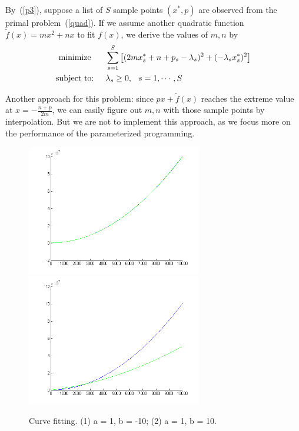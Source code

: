 By~(\ref{p3}), suppose a list of $S$ sample points $(x^*,p)$ are observed from the primal problem~(\ref{quad}). If we assume another quadratic function $\tilde{f}(x)=mx^2+nx$ to fit $f(x)$, we derive the values of $m,n$ by
\begin{align*}
\begin{split}
\textrm{minimize }\hspace{.2in}&\sum_{s=1}^S\left[(2mx_s^*+n+p_s-\lambda_s)^2+(-\lambda_s x_s^*)^2\right]\\
\textrm{subject to:}\hspace{.2in}&\lambda_s\ge0,\hspace{.1in}s=1,\cdots,S
\end{split}
\end{align*}

Another approach for this problem: since $px+\tilde{f}(x)$ reaches the extreme value at $x=-\frac{n+p}{2m}$, we can easily figure out $m,n$ with those sample points by interpolation. But we are not to implement this approach, as we focus more on the performance of the parameterized programming.

\begin{figure}\label{fig:case1}
\centering
\includegraphics[width=3in]{plots/p1.png}
\includegraphics[width=3in]{plots/p2.png}
\caption{Curve fitting. (1) a = 1, b = -10; (2) a = 1, b = 10.}
\end{figure}

